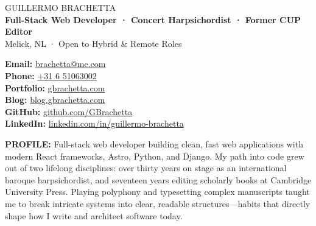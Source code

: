 \documentclass[a4paper]{article}
\begin{document}
\color{ink}

\noindent
\begin{minipage}[t]{0.65\textwidth}
  {\fontsize{21}{23}\headerfont\color{ink} GUILLERMO BRACHETTA}\\[2.5pt]
  {\fontsize{9}{11}\textbf{\color{accent} Full-Stack Web Developer · Concert Harpsichordist · Former CUP Editor}}\\[1.5pt]
  {\fontsize{8}{10}\color{inksoft} Melick, NL · Open to Hybrid \& Remote Roles}
\end{minipage}
\hfill
\begin{minipage}[t]{0.33\textwidth}
  \raggedleft\fontsize{7.8}{10}\selectfont
  \textbf{Email:} \href{mailto:brachetta@me.com}{brachetta@me.com}\\[1pt]
  \textbf{Phone:} \href{tel:+31651063002}{+31 6 51063002}\\[1pt]
  \textbf{Portfolio:} \href{https://gbrachetta.com}{gbrachetta.com}\\[1pt]
  \textbf{Blog:} \href{https://blog.gbrachetta.com}{blog.gbrachetta.com}\\[1pt]
  \textbf{GitHub:} \href{https://github.com/GBrachetta}{github.com/GBrachetta}\\[1pt]
  \textbf{LinkedIn:} \href{https://linkedin.com/in/guillermo-brachetta}{linkedin.com/in/guillermo-brachetta}
\end{minipage}

\vspace{4pt}

\begin{tcolorbox}[
  colback=accentlight,
  colframe=accent,
  arc=2.5pt,
  boxrule=0.6pt,
  top=4.5pt,bottom=4.5pt,left=6pt,right=6pt
]
  \fontsize{7.8}{10.5}\selectfont
  \textbf{\color{accent} PROFILE:}\hspace{4pt}
  Full-stack web developer building clean, fast web applications with modern React frameworks, Astro, Python, and Django. My path into code grew out of two lifelong disciplines: over thirty years on stage as an international baroque harpsichordist, and seventeen years editing scholarly books at Cambridge University Press. Playing polyphony and typesetting complex manuscripts taught me to break intricate systems into clear, readable structures—habits that directly shape how I write and architect software today.
\end{tcolorbox}

\vspace{-3pt}
\end{document}
